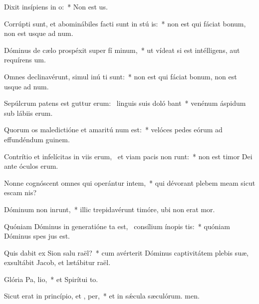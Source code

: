 \item Dixit insípiens in  o:~* Non est us.
\item Corrúpti sunt, et abominábiles facti sunt in stú is:~* non est qui fáciat bonum, non est usque ad num.
\item Dóminus de cælo prospéxit super fí minum,~* ut vídeat si est intélligens, aut requírens um.
\item Omnes declinavérunt, simul inú ti sunt:~* non est qui fáciat bonum, non est usque ad num.
\item Sepúlcrum patens est guttur erum:~\pscross{} linguis suis doló bant~* venénum áspidum sub lábiis erum.
\item Quorum os maledictióne et amaritú num est:~* velóces pedes eórum ad effundéndum guinem.
\item Contrítio et infelícitas in viis erum,~\pscross{} et viam pacis non runt:~* non est timor Dei ante óculos erum.
\item Nonne cognóscent omnes qui operántur intem,~* qui dévorant plebem meam sicut escam nis?
\item Dóminum non inrunt,~* illic trepidavérunt timóre, ubi non erat mor.
\item Quóniam Dóminus in generatióne ta est,~\pscross{} consílium ínopis tis:~* quóniam Dóminus spes jus est.
\item Quis dabit ex Sion salu raël?~* cum avérterit Dóminus captivitátem plebis suæ, exsultábit Jacob, et lætábitur raël.
\item Glória Pa,  lio,~* et Spirítui to.
\item Sicut erat in princípio, et ,  per,~* et in sǽcula sæculórum. men.
